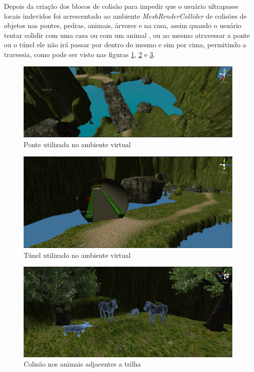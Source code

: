 Depois da criação dos blocos de colisão para impedir que o usuário ultrapasse locais indevidos foi acrescentado ao ambiente \textit{ MeshRenderCollider } de colisões de objetos nas pontes, pedras, animais, árvores e na casa, assim quando o usuário tentar colidir com uma casa ou com um animal , ou ao mesmo atravessar a ponte ou o túnel ele não irá passar por dentro do mesmo e sim por cima, permitindo a travessia, como pode ser visto nas figuras \ref{fig:bridgePosition}, \ref{fig:newTunnel} e \ref{fig:animalsCollider}.

\begin{figure}[h]
  \centering
  \includegraphics[width=1.0\textwidth]{figuras/bridgePosition}
  \caption{Ponte utilizada no ambiente virtual}
  \label{fig:bridgePosition}
\end{figure}

\begin{figure}[h]
  \centering
  \includegraphics[width=1.0\textwidth]{figuras/newTunnel}
  \caption{Túnel utilizado no ambiente virtual}
  \label{fig:newTunnel}
\end{figure}

\begin{figure}[h]
  \centering
  \includegraphics[width=1.0\textwidth]{figuras/animalsCollider}
  \caption{Colisão nos animais adjacentes a trilha}
  \label{fig:animalsCollider}
\end{figure}

